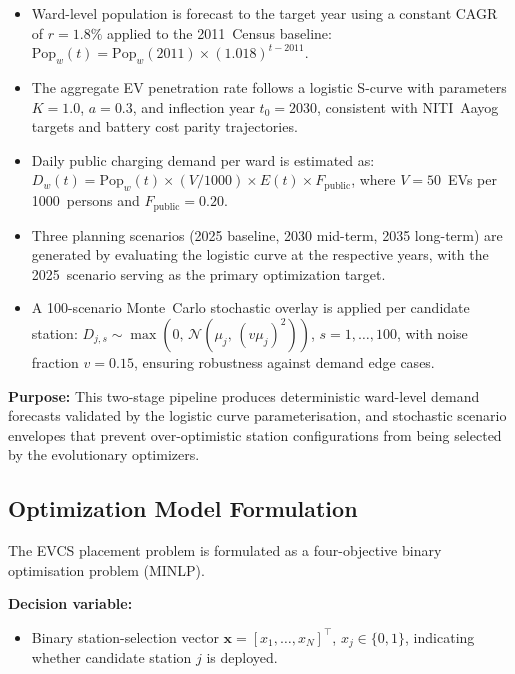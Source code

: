 \begin{itemize}
    \item Ward-level population is forecast to the target year using
          a constant CAGR of $r = 1.8\%$ applied to the 2011~Census
          baseline:
          $\text{Pop}_w(t) = \text{Pop}_w(2011)\times(1.018)^{t-2011}$.
    \item The aggregate EV penetration rate follows a logistic
          S-curve with parameters $K = 1.0$, $a = 0.3$, and
          inflection year $t_0 = 2030$, consistent with NITI~Aayog
          targets and battery cost parity trajectories.
    \item Daily public charging demand per ward is estimated as:
          $D_w(t) = \text{Pop}_w(t)\times(V/1000)\times E(t)
          \times F_{\text{public}}$, where $V = 50$~EVs per
          1000~persons and $F_{\text{public}} = 0.20$.
    \item Three planning scenarios (2025 baseline, 2030 mid-term,
          2035 long-term) are generated by evaluating the logistic
          curve at the respective years, with the 2025~scenario
          serving as the primary optimization target.
    \item A 100-scenario Monte~Carlo stochastic overlay is applied
          per candidate station: $D_{j,s} \sim \max(0,\,
          \mathcal{N}(\mu_j,\,(v\mu_j)^2))$, $s = 1,\dots,100$,
          with noise fraction $v = 0.15$, ensuring robustness
          against demand edge cases.
\end{itemize}

\noindent\textbf{Purpose:} This two-stage pipeline produces
deterministic ward-level demand forecasts validated by the logistic
curve parameterisation, and stochastic scenario envelopes that
prevent over-optimistic station configurations from being selected
by the evolutionary optimizers.

\subsection{Optimization Model Formulation}
The EVCS placement problem is formulated as a four-objective binary
optimisation problem (MINLP).

\textbf{Decision variable:}
\begin{itemize}
    \item Binary station-selection vector
          $\mathbf{x} = [x_1,\dots,x_N]^{\top}$,
          $x_j \in \{0,1\}$, indicating whether candidate
          station $j$ is deployed.
\end{itemize}

